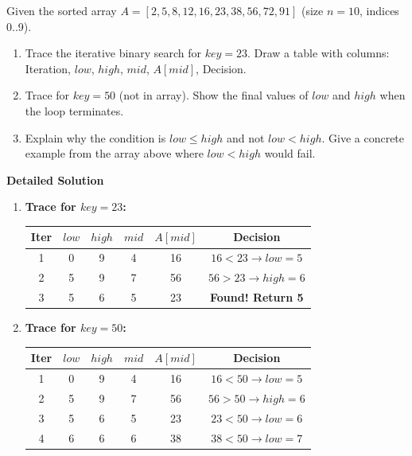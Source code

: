 \documentclass[11pt]{article}
\begin{document}
\begin{exoresolu}
    Given the sorted array $A = [2, 5, 8, 12, 16, 23, 38, 56, 72, 91]$ (size $n=10$, indices 0..9).
    \begin{enumerate}
        \item Trace the iterative binary search for $key = 23$. Draw a table with columns: Iteration, $low$, $high$, $mid$, $A[mid]$, Decision.
        \item Trace for $key = 50$ (not in array). Show the final values of $low$ and $high$ when the loop terminates.
        \item Explain why the condition is $low \le high$ and not $low < high$. Give a concrete example from the array above where $low < high$ would fail.
    \end{enumerate}
    \tcblower
    \textbf{Detailed Solution}
    \begin{enumerate}
        \item \textbf{Trace for $key = 23$:}
            \begin{center}
            \begin{tabular}{|c|c|c|c|c|c|}\hline
            \rowcolor{popblueL}
            Iter & $low$ & $high$ & $mid$ & $A[mid]$ & Decision \\ \hline
            1 & 0 & 9 & 4 & 16 & $16 < 23 \rightarrow low = 5$ \\ \hline
            2 & 5 & 9 & 7 & 56 & $56 > 23 \rightarrow high = 6$ \\ \hline
            3 & 5 & 6 & 5 & 23 & \textbf{Found! Return 5} \\ \hline
            \end{tabular}
            \end{center}
        \item \textbf{Trace for $key = 50$:}
            \begin{center}
            \begin{tabular}{|c|c|c|c|c|c|}\hline
            \rowcolor{popblueL}
            Iter & $low$ & $high$ & $mid$ & $A[mid]$ & Decision \\ \hline
            1 & 0 & 9 & 4 & 16 & $16 < 50 \rightarrow low = 5$ \\ \hline
            2 & 5 & 9 & 7 & 56 & $56 > 50 \rightarrow high = 6$ \\ \hline
            3 & 5 & 6 & 5 & 23 & $23 < 50 \rightarrow low = 6$ \\ \hline
            4 & 6 & 6 & 6 & 38 & $38 < 50 \rightarrow low = 7$ \\ \hline

\end{tabular}
\end{center}
\end{enumerate}
\end{exoresolu}
\end{document}
